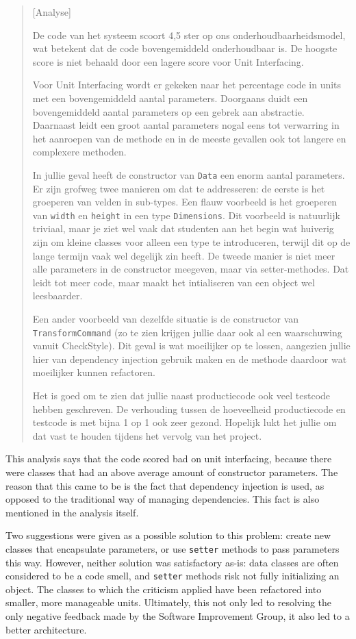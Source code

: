\begin{quotation}
[Analyse]

De code van het systeem scoort 4,5 ster op ons onderhoudbaarheidsmodel, wat
betekent dat de code bovengemiddeld onderhoudbaar is. De hoogste score is niet
behaald door een lagere score voor Unit Interfacing.

Voor Unit Interfacing wordt er gekeken naar het percentage code in units met een
bovengemiddeld aantal parameters. Doorgaans duidt een bovengemiddeld aantal
parameters op een gebrek aan abstractie. Daarnaast leidt een groot aantal
parameters nogal eens tot verwarring in het aanroepen van de methode en in de
meeste gevallen ook tot langere en complexere methoden.

In jullie geval heeft de constructor van \texttt{Data} een enorm aantal
parameters. Er zijn grofweg twee manieren om dat te addresseren: de eerste is
het groeperen van velden in sub-types. Een flauw voorbeeld is het groeperen van
\texttt{width} en \texttt{height} in een type \texttt{Dimensions}.
Dit voorbeeld is natuurlijk triviaal, maar je ziet wel vaak dat studenten aan
het begin wat huiverig zijn om kleine classes voor alleen een type te
introduceren, terwijl dit op de lange termijn vaak wel degelijk zin heeft. De
tweede manier is niet meer alle parameters in de constructor meegeven, maar via
setter-methodes. Dat leidt tot meer code, maar maakt het intialiseren van een
object wel leesbaarder.

Een ander voorbeeld van dezelfde situatie is de constructor van
\texttt{TransformCommand} (zo te zien krijgen jullie daar ook al een
waarschuwing vanuit CheckStyle). Dit geval is wat moeilijker op te lossen,
aangezien jullie hier van dependency injection gebruik maken en de methode
daardoor wat moeilijker kunnen refactoren.

Het is goed om te zien dat jullie naast productiecode ook veel testcode hebben
geschreven. De verhouding tussen de hoeveelheid productiecode en testcode is met
bijna 1 op 1 ook zeer gezond. Hopelijk lukt het jullie om dat vast te houden
tijdens het vervolg van het project.
\end{quotation}

This analysis says that the code scored bad on unit interfacing, because there
were classes that had an above average amount of constructor
parameters. The reason that this came to be is the fact that dependency
injection is used, as opposed to the traditional way of managing dependencies.
This fact is also mentioned in the analysis itself.

Two suggestions were given as a possible solution to this problem: create new
classes that encapsulate parameters, or use \texttt{setter} methods
to pass parameters this way. However, neither solution was satisfactory as-is:
data classes are often considered to be a code smell, and \texttt{setter}
methods risk not fully initializing an object. The classes to which the
criticism applied have been refactored into smaller, more manageable units.
Ultimately, this not only led to resolving the only negative feedback made by
the Software Improvement Group, it also led to a better architecture.

